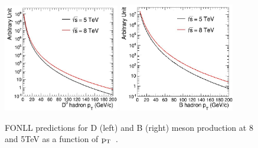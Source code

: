 \begin{figure}[h]
\begin{center}
\includegraphics[width= 0.45\textwidth]{figures/D-Sigma.jpg}
\includegraphics[width= 0.45\textwidth]{figures/B-Sigma.jpg}
\caption{FONLL predictions for D (left) and B (right) meson production at 8 and 5TeV as a function of $\rm p_{T}$~\cite{FONLLcharmbottomPP1}.}
\label{fig:plotsDBpredictions}
\end{center}
\end{figure}
